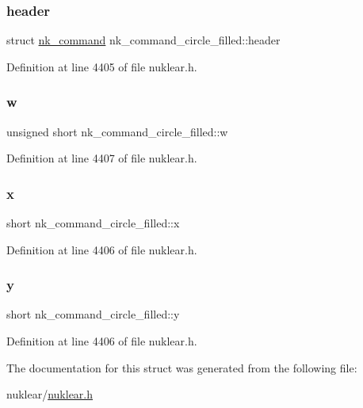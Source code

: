 \subsubsection{\texorpdfstring{header}{header}}
{\footnotesize\ttfamily struct \mbox{\hyperlink{structnk__command}{nk\+\_\+command}} nk\+\_\+command\+\_\+circle\+\_\+filled\+::header}



Definition at line 4405 of file nuklear.\+h.

\mbox{\label{structnk__command__circle__filled_aafd7973ccf4203a120db5510ea11a98d}} 
\subsubsection{\texorpdfstring{w}{w}}
{\footnotesize\ttfamily unsigned short nk\+\_\+command\+\_\+circle\+\_\+filled\+::w}



Definition at line 4407 of file nuklear.\+h.

\mbox{\label{structnk__command__circle__filled_ac8d5a03cb675627590860653ae24eec4}} 
\subsubsection{\texorpdfstring{x}{x}}
{\footnotesize\ttfamily short nk\+\_\+command\+\_\+circle\+\_\+filled\+::x}



Definition at line 4406 of file nuklear.\+h.

\mbox{\label{structnk__command__circle__filled_a85b0338c5be8741816dd7f9ba0693918}} 
\subsubsection{\texorpdfstring{y}{y}}
{\footnotesize\ttfamily short nk\+\_\+command\+\_\+circle\+\_\+filled\+::y}



Definition at line 4406 of file nuklear.\+h.



The documentation for this struct was generated from the following file\+:\begin{DoxyCompactItemize}
\item 
nuklear/\mbox{\hyperlink{nuklear_8h}{nuklear.\+h}}\end{DoxyCompactItemize}
